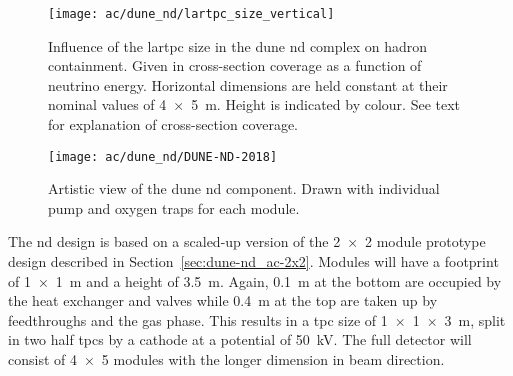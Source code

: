 \begin{figure}[htb]
	\centering
	\texttt{[image: ac/dune\_nd/lartpc\_size\_vertical]}
	\caption[\AC{}   hadron containment]{%
		Influence of the \acrshort{lartpc} size in the \acrshort{dune} \acrshort{nd} complex on hadron containment.
		Given in cross-section coverage as a function of neutrino energy.
		Horizontal dimensions are held constant at their nominal values of \SI{4 x 5}{\metre}.
		Height is indicated by colour.
		See text for explanation of cross-section coverage.~\cite{lartpcSizeChris}
	}
	\label{fig:dune-nd_lartpc-size}
\end{figure}

\begin{figure}[htb]
	\centering
	\texttt{[image: ac/dune\_nd/DUNE-ND-2018]}
	\caption[\AC{}   artistic view]{%
		Artistic view of the \acrshort{dune} \acrshort{nd} \AC{} component.
		Drawn with individual pump and oxygen traps for each module.
	}
	\label{fig:dune-nd_ac}
\end{figure}

The \AC{} \gls{nd} design is based on a scaled-up version of the \num{2 x 2} module prototype design described in Section~\ref{sec:dune-nd_ac-2x2}.
Modules will have a footprint of \SI{1 x 1}{\metre} and a height of \SI{3.5}{\metre}.
Again, \SI{0.1}{\metre} at the bottom are occupied by the heat exchanger and valves while \SI{0.4}{\metre} at the top are taken up by feedthroughs and the gas phase.
This results in a \gls{tpc} size of \SI{1 x 1 x 3}{\metre}, split in two half \glspl{tpc} by a cathode at a potential of \SI{50}{\kilo\volt}.
The full detector will consist of \num{4 x 5} modules with the longer dimension in beam direction.

